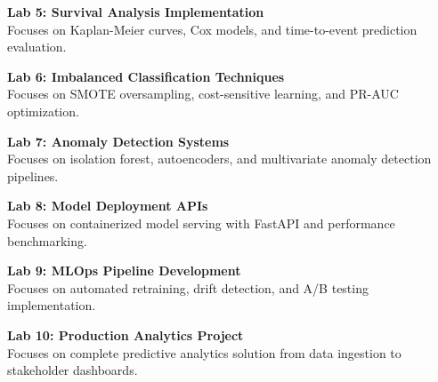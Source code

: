 \vspace{0.2cm}

\noindent\textbf{Lab 5: Survival Analysis Implementation} \\
Focuses on Kaplan-Meier curves, Cox models, and time-to-event prediction evaluation.

\vspace{0.2cm}

\noindent\textbf{Lab 6: Imbalanced Classification Techniques} \\
Focuses on SMOTE oversampling, cost-sensitive learning, and PR-AUC optimization.

\vspace{0.2cm}

\noindent\textbf{Lab 7: Anomaly Detection Systems} \\
Focuses on isolation forest, autoencoders, and multivariate anomaly detection pipelines.

\vspace{0.2cm}

\noindent\textbf{Lab 8: Model Deployment APIs} \\
Focuses on containerized model serving with FastAPI and performance benchmarking.

\vspace{0.2cm}

\noindent\textbf{Lab 9: MLOps Pipeline Development} \\
Focuses on automated retraining, drift detection, and A/B testing implementation.

\vspace{0.2cm}

\noindent\textbf{Lab 10: Production Analytics Project} \\
Focuses on complete predictive analytics solution from data ingestion to stakeholder dashboards.

\vspace{0.2cm}

\newpage
{}
